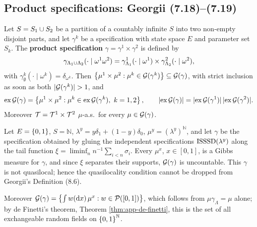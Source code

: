 \subsection*{Product specifications: Georgii (7.18)--(7.19)}

\begin{example}
    \label{ex:app-product-spec}

    Let $S = S_1 \cup S_2$ be a partition of a countably infinite $S$ into two non-empty
    disjoint parts, and let $\gamma^k$ be a specification with state space $E$ and parameter
    set $S_k$.  The \textbf{product specification} $\gamma = \gamma^1 \times \gamma^2$ is
    defined by
    \[\gamma_{\Lambda_1 \cup \Lambda_2}(\cdot \mid \omega^1\omega^2)
      = \gamma^1_{\Lambda_1}(\cdot \mid \omega^1) \times
        \gamma^2_{\Lambda_2}(\cdot \mid \omega^2),\]
    with $\gamma^k_{\emptyset}(\cdot \mid \omega^k) = \delta_{\omega^k}$.  Then
    $\left\{ \mu^1 \times \mu^2 : \mu^k \in \mathcal{G}(\gamma^k) \right\} \subseteq \mathcal{G}(\gamma)$, with
    strict inclusion as soon as both $|\mathcal{G}(\gamma^k)| > 1$, and
    \[\mathrm{ex}\,\mathcal{G}(\gamma)
      = \left\{ \mu^1 \times \mu^2 : \mu^k \in \mathrm{ex}\,\mathcal{G}(\gamma^k), \ k = 1,2 \right\},
      \qquad
      |\mathrm{ex}\,\mathcal{G}(\gamma)| = |\mathrm{ex}\,\mathcal{G}(\gamma^1)|\,
        |\mathrm{ex}\,\mathcal{G}(\gamma^2)|.\]
    Moreover $\mathcal{T} = \mathcal{T}^1 \times \mathcal{T}^2$ $\mu$-a.s.\ for every $\mu \in \mathcal{G}(\gamma)$.
\end{example}

\begin{remark}
    \label{rmk:app-two-27}
    \leanok

    Let $E = \left\{ 0,1 \right\}$, $S = \mathbb{N}$, $\lambda^y = y\delta_1 + (1-y)\delta_0$,
    $\mu^y = (\lambda^y)^{\mathbb{N}}$, and let $\gamma$ be the specification obtained by gluing
    the independent specifications $\operatorname{ISSSD}(\lambda^y)$ along the tail function
    $\xi = \liminf_n n^{-1}\sum_{i<n}\sigma_i$.  Every $\mu^x$, $x \in [0,1]$, is a Gibbs
    measure for $\gamma$, and since $\xi$ separates their supports, $\mathcal{G}(\gamma)$ is
    uncountable.  This $\gamma$ is not quasilocal; hence the quasilocality condition cannot be
    dropped from Georgii's Definition (8.6).

    Moreover $\mathcal{G}(\gamma) = \left\{ \int w(\mathrm{d}x)\,\mu^x : w \in \mathcal{P}([0,1]) \right\}$, which
    follows from $\mu\gamma_\Lambda = \mu$ alone; by de Finetti's theorem, Theorem
    \ref{thm:app-de-finetti}, this is the set of all exchangeable random fields on
    $\left\{ 0,1 \right\}^{\mathbb{N}}$.
\end{remark}
